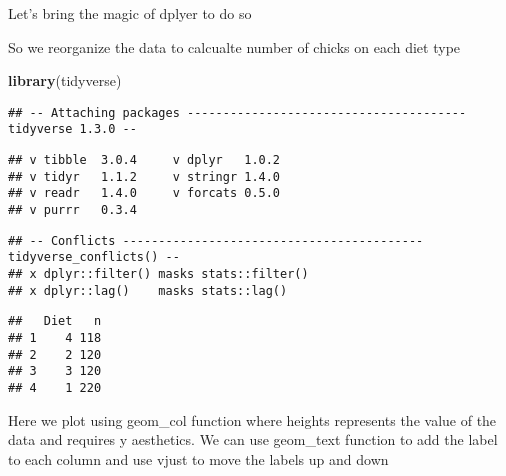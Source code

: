 \documentclass[
]{book}
\newenvironment{Shaded}{\begin{snugshade}}{\end{snugshade}}
\newcommand{\KeywordTok}[1]{\textcolor[rgb]{0.13,0.29,0.53}{\textbf{#1}}}
\newcommand{\NormalTok}[1]{#1}
\newcommand{\OperatorTok}[1]{\textcolor[rgb]{0.81,0.36,0.00}{\textbf{#1}}}
\newcommand{\StringTok}[1]{\textcolor[rgb]{0.31,0.60,0.02}{#1}}
\begin{document}
Let's bring the magic of dplyer to do so

So we reorganize the data to calcualte number of chicks on each diet type

\begin{Shaded}
\begin{Highlighting}[]
\KeywordTok{library}\NormalTok{(tidyverse)}
\end{Highlighting}
\end{Shaded}

\begin{verbatim}
## -- Attaching packages --------------------------------------- tidyverse 1.3.0 --
\end{verbatim}

\begin{verbatim}
## v tibble  3.0.4     v dplyr   1.0.2
## v tidyr   1.1.2     v stringr 1.4.0
## v readr   1.4.0     v forcats 0.5.0
## v purrr   0.3.4
\end{verbatim}

\begin{verbatim}
## -- Conflicts ------------------------------------------ tidyverse_conflicts() --
## x dplyr::filter() masks stats::filter()
## x dplyr::lag()    masks stats::lag()
\end{verbatim}

\begin{Shaded}
\end{Shaded}

\begin{verbatim}
##   Diet   n
## 1    4 118
## 2    2 120
## 3    3 120
## 4    1 220
\end{verbatim}

Here we plot using geom\_col function where heights represents the value of the data and requires y aesthetics. We can use geom\_text function to add the label to each column and use vjust to move the labels up and down
\end{document}
